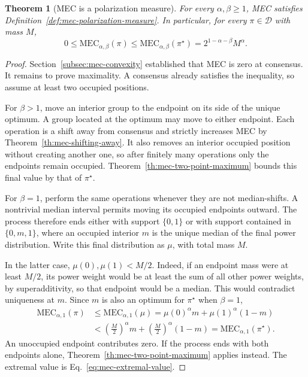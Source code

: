 \documentclass{article}
\theoremstyle{plain}
\newtheorem{theorem}{Theorem}
\theoremstyle{remark}
\begin{document}
\begin{theorem}[MEC is a polarization measure]\label{th:mec-polarization-measure}
For every $\alpha,\beta\geq1$, MEC satisfies Definition~\ref{def:mec-polarization-measure}. In particular, for every $\pi\in\mathcal{D}$ with mass $M$,
\begin{equation}\label{eq:mec-general-maximum}
0\leq\mathrm{MEC}_{\alpha,\beta}(\pi)
\leq\mathrm{MEC}_{\alpha,\beta}(\pi^\star)
=2^{1-\alpha-\beta}M^\alpha.
\end{equation}
\end{theorem}
\begin{proof}
Section~\ref{subsec:mec-convexity} established that MEC is zero at consensus. It remains to prove maximality. A consensus already satisfies the inequality, so assume at least two occupied positions.

For $\beta>1$, move an interior group to the endpoint on its side of the unique optimum. A group located at the optimum may move to either endpoint. Each operation is a shift away from consensus and strictly increases MEC by Theorem~\ref{th:mec-shifting-away}. It also removes an interior occupied position without creating another one, so after finitely many operations only the endpoints remain occupied. Theorem~\ref{th:mec-two-point-maximum} bounds this final value by that of $\pi^\star$.

For $\beta=1$, perform the same operations whenever they are not median-shifts. A nontrivial median interval permits moving its occupied endpoints outward. The process therefore ends either with support $\{0,1\}$ or with support contained in $\{0,m,1\}$, where an occupied interior $m$ is the unique median of the final power distribution. Write this final distribution as $\mu$, with total mass $M$.

In the latter case, $\mu(0),\mu(1)<M/2$. Indeed, if an endpoint mass were at least $M/2$, its power weight would be at least the sum of all other power weights, by superadditivity, so that endpoint would be a median. This would contradict uniqueness at $m$. Since $m$ is also an optimum for $\pi^\star$ when $\beta=1$,
\[
\begin{aligned}
\mathrm{MEC}_{\alpha,1}(\pi)
&\leq\mathrm{MEC}_{\alpha,1}(\mu)
=\mu(0)^\alpha m+\mu(1)^\alpha(1-m)\\
&<\left(\frac{M}{2}\right)^\alpha m
 +\left(\frac{M}{2}\right)^\alpha(1-m)
=\mathrm{MEC}_{\alpha,1}(\pi^\star).
\end{aligned}
\]
An unoccupied endpoint contributes zero. If the process ends with both endpoints alone, Theorem~\ref{th:mec-two-point-maximum} applies instead. The extremal value is Eq.~\eqref{eq:mec-extremal-value}.
\end{proof}
\end{document}
